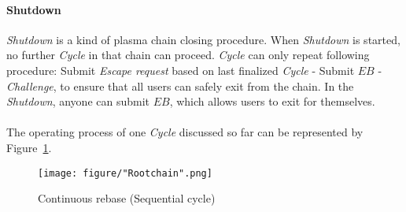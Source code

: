 \documentclass[letterpaper, 11pt]{article}
\begin{document}
\paragraph{Shutdown}
\begin{CJK}{UTF8}{mj}
\emph{Shutdown} is a kind of plasma chain closing procedure. When \emph{Shutdown} is started, no further \emph{Cycle} in that chain can proceed. \emph{Cycle} can only repeat following procedure: Submit \emph{Escape request} based on last finalized \emph{Cycle} - Submit $EB$ - \emph{Challenge}, to ensure that all users can safely exit from the chain. In the \emph{Shutdown}, anyone can submit $EB$, which allows users to exit for themselves. \\
\\
The operating process of one \emph{Cycle} discussed so far can be represented by Figure~\ref{fig:continuouse-rebase}.


\begin{figure}[!h]
\centering
\texttt{[image: figure/"Rootchain".png]}
\caption{Continuous rebase (Sequential cycle)}
\label{fig:continuouse-rebase}
\end{figure}

\end{CJK}
\end{document}
